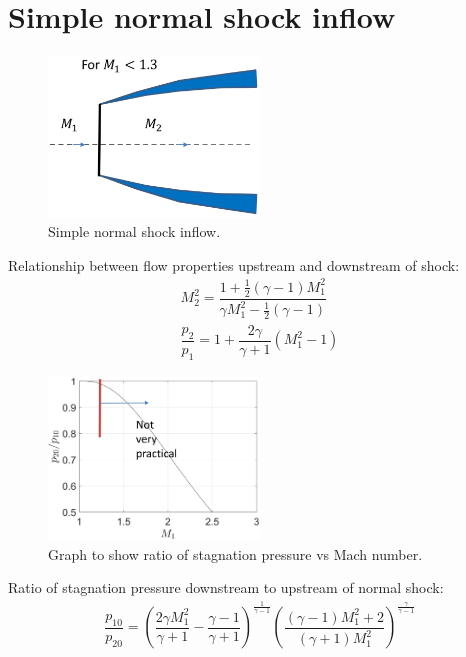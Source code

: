 \documentclass[class=report, crop=false, 12pt,a4paper]{standalone}
\begin{document}
\section{Simple normal shock inflow}
\begin{figure}[H]
    \centering
    \includegraphics[width = 0.5\textwidth]{../img/diagram46.png}
    \caption{Simple normal shock inflow.}
\end{figure}
Relationship between flow properties upstream and downstream of shock:
\begin{gather}
    M^2_2 = \dfrac{1 + \frac{1}{2}\left(\gamma - 1\right)M^2_1}{\gamma M^2_1 - \frac{1}{2}\left(\gamma - 1\right)}\\
    \dfrac{p_2}{p_1} = 1 + \dfrac{2\gamma}{\gamma + 1}\left(M^2_1 - 1\right)
\end{gather}
\begin{figure}[H]
    \centering
    \includegraphics[width = 0.5\textwidth]{../img/diagram47.png}
    \caption{Graph to show ratio of stagnation pressure vs Mach number.}
\end{figure}
Ratio of stagnation pressure downstream to upstream of normal shock:
\begin{gather}
    \dfrac{p_{10}}{p_{20}} = \left(\dfrac{2\gamma M^2_1}{\gamma + 1}- \dfrac{\gamma - 1}{\gamma +1}\right)^{\frac{1}{\gamma - 1}}\left(\dfrac{\left(\gamma -1 \right)M^2_1+2}{\left(\gamma +1\right)M^2_1}\right)^{\frac{\gamma}{\gamma - 1}}
\end{gather}
\end{document}
